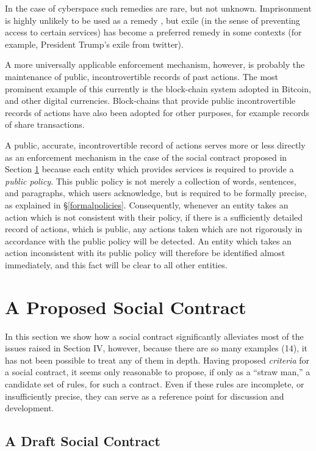In the case of cyberspace such remedies are rare, but not unknown. Imprisonment is
highly unlikely to be used as a remedy     \cite{parameswaran2007social}, but exile (in the sense of preventing
access to certain services) has become a preferred remedy in some contexts (for example,
President Trump's exile from twitter).

A more universally applicable enforcement mechanism, however, is probably the
maintenance of public, incontrovertible records of past actions. The most prominent
example of this currently is the block-chain system adopted in Bitcoin, and 
other digital currencies. Block-chains that provide public incontrovertible
records of actions have also been adopted for other purposes, for example records
of share transactions.

A public, accurate, incontrovertible record of actions serves more or less directly
as an enforcement mechanism in the case of the social contract proposed in
Section \ref{proposedsc} because each entity which provides services is required
to provide a {\em public policy}. This public policy is not merely a collection
of words, sentences, and paragraphs, which users acknowledge, but is required
to be formally precise, as explained in \S\ref{formalpolicies}. Consequently, whenever
an entity takes an action which is not consistent with their policy, if there
is a sufficiently detailed record of actions, which is public, any actions taken
which are not rigorously in accordance with the public policy will be detected.
An entity which takes an action inconsistent with its public policy will therefore
be identified almost immediately, and this fact will be clear to all other entities.

\section{A Proposed Social Contract}\label{proposedsc}

In this section we show how a social contract significantly alleviates most of the issues raised in Section IV, however, because there are so many examples (14), it has not been possible to treat any of them in depth.
Having proposed {\em criteria} for a social contract, it seems only reasonable to
propose, if only as a ``straw man,'' a candidate set of rules, for such a contract.
Even if these rules are incomplete, or insufficiently precise, they can serve as
a reference point for discussion and development.

\subsection{A Draft Social Contract}\label{draft}

